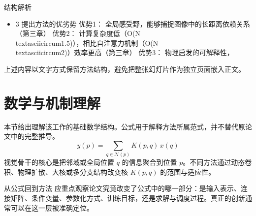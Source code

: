 \documentclass[UTF8,11pt,a4paper]{ctexart}
\begin{document}
\begin{keybox}{结构解析}
\begin{itemize}
\item 3 提出方法的优劣势 优势1： 全局感受野，能够捕捉图像中的长距离依赖关系（第三章） 优势2： 计算复杂度低（O(N\\textasciicircum{}1.5)），相比自注意力机制（O(N\\textasciicircum{}2)）效率更高（第三章） 优势3： 物理启发的可解释性，
\end{itemize}
\end{keybox}

上述内容以文字方式保留方法结构，避免把整张幻灯片作为独立页面嵌入正文。

\section{数学与机制理解}
本节给出理解该工作的基础数学结构。公式用于解释方法所属范式，并不替代原论文中的完整推导。
\begin{equation}
y(p)=\sum_{q\in\mathcal N(p)}K(p,q)\,x(q)
\end{equation}
视觉骨干的核心是把邻域或全局位置 $q$ 的信息聚合到位置 $p$。不同方法通过动态卷积、物理扩散、大核或多分支结构改变核 $K(p,q)$ 的范围与适应性。

\begin{keybox}{从公式回到方法}
应重点观察论文究竟改变了公式中的哪一部分：是输入表示、连接矩阵、条件变量、参数化方式、训练目标，还是求解与调度过程。真正的创新通常可以在这一层被准确定位。
\end{keybox}
\end{document}
